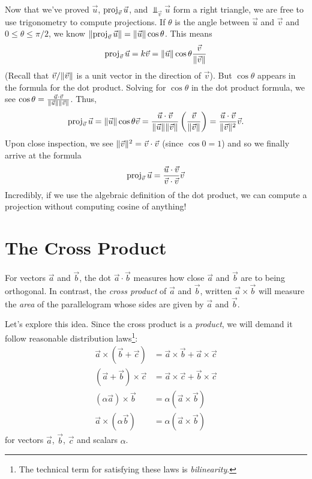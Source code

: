 Now that we've proved $\vec u$, $\operatorname{proj}_{\vec v}\vec u$,
and $\Perp_{\vec v}\vec u$ form a right triangle, we are free to use
trigonometry to compute projections.  If $\theta$ is the angle between $\vec u$
and $\vec v$ and $0\leq \theta\leq \pi/2$, 
we know $\lVert\operatorname{proj}_{\vec v}\vec u\rVert=\lVert\vec u\rVert\cos\theta$.  This means
\[
	\operatorname{proj}_{\vec v}\vec u = k\vec v=\lVert\vec u\rVert\cos\theta\frac{\vec v}{\lVert\vec v\rVert}
\]
(Recall that $\vec v/\lVert\vec v\rVert$ is a unit vector in the direction of $\vec v$).
But $\cos \theta$ appears in the formula for the dot product.  Solving for
$\cos\theta$ in the dot product formula, we see $\cos\theta=\frac{\vec u\cdot\vec v}{\lVert\vec u\rVert\lVert\vec v\rVert}$.
Thus,
\[
	\operatorname{proj}_{\vec v}\vec u = \lVert\vec u\rVert\cos\theta\vec v
	=\frac{\vec u\cdot \vec v}{\lVert\vec u\rVert\lVert\vec v\rVert}\left(\frac{\vec v}{\lVert\vec v\rVert}\right)
	=\frac{\vec u\cdot \vec v}{\lVert\vec v\rVert^2}\vec v.
\]
Upon close inspection, we see $\lVert\vec v\rVert^2=\vec v\cdot \vec v$ (since $\cos 0=1$)
and so we finally arrive at the formula
\[
	\operatorname{proj}_{\vec v}\vec u  
	=\frac{\vec u\cdot \vec v}{\vec v\cdot \vec v}\vec v
\]
Incredibly, if we use the algebraic definition of the dot product, we can
compute a projection without computing cosine of anything!

\begin{exercises}
\end{exercises}

\section{The Cross Product}

For vectors $\vec a$ and $\vec b$, the dot $\vec a\cdot \vec b$ measures
how close $\vec a$ and $\vec b$ are to being orthogonal.  In contrast,
the \emph{cross product} of $\vec a$ and $\vec b$,
written $\vec a\times \vec b$ will
measure the \emph{area} of the parallelogram whose sides are given by $\vec a$ and
$\vec b$.

Let's explore this idea.  Since the cross product is a \emph{product}, we will
demand it follow reasonable distribution laws\footnote{ The technical term
for satisfying these laws is \emph{bilinearity}.}:
\begin{align*}
	\vec a\times (\vec b+\vec c) &= \vec a\times \vec b+\vec a\times\vec c\\
	(\vec a+\vec b)\times\vec c &= \vec a\times \vec c+\vec b\times \vec c\\
	(\alpha\vec a)\times \vec b &= \alpha(\vec a\times \vec b)\\
	\vec a\times(\alpha \vec b) &= \alpha(\vec a\times \vec b)
\end{align*}
for vectors $\vec a$, $\vec b$, $\vec c$ and scalars $\alpha$.

